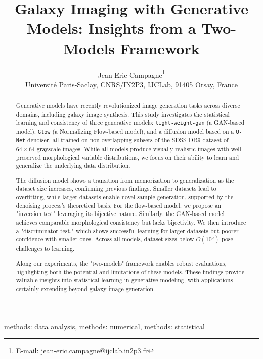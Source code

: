 \documentclass[fleqn,usenatbib]{mnras}
\title[Galaxy Imaging with Generative Models]{Galaxy Imaging with Generative Models: Insights from a Two-Models Framework}
\author[J.E Campagne]{
 Jean-Eric Campagne\thanks{E-mail: jean-eric.campagne@ijclab.in2p3.fr}\orcidlink{0000-0002-1590-6927}\\
 Université Paris-Saclay, CNRS/IN2P3, IJCLab,  91405 Orsay, France
}
\begin{document}
\label{firstpage}
\pagerange{\pageref{firstpage}--\pageref{lastpage}}
\maketitle

\begin{abstract}
Generative models have recently revolutionized image generation tasks across diverse domains, including galaxy image synthesis. This study investigates the statistical learning and consistency of three generative models: \texttt{light-weight-gan} (a GAN-based model), \texttt{Glow} (a Normalizing Flow-based model), and a diffusion model based on a \texttt{U-Net} denoiser, all trained on non-overlapping subsets of the SDSS {\color{red}DR9} dataset of $64 \times 64$ grayscale images. While all models produce visually realistic images with well-preserved morphological variable distributions, we focus on their ability to learn and generalize the underlying data distribution.

The diffusion model shows a transition from memorization to generalization as the dataset size increases, confirming previous findings. Smaller datasets lead to overfitting, while larger datasets enable novel sample generation, supported by the denoising process's theoretical basis. For the flow-based model, we propose an "inversion test" leveraging its bijective nature. Similarly, the GAN-based model achieves comparable morphological consistency but lacks bijectivity. We then introduce a "discriminator test," which shows successful learning for larger datasets but poorer confidence with smaller ones. Across all models, dataset sizes below $O(10^5)$ pose challenges to learning.

Along our experiments, the "two-models" framework enables robust evaluations, highlighting both the potential and limitations of these models. These findings provide valuable insights into statistical learning in generative modeling, with applications certainly extending beyond galaxy image generation.
\end{abstract}


\begin{keywords}
methods: data analysis, methods: numerical, methods: statistical
\end{keywords}
\end{document}
